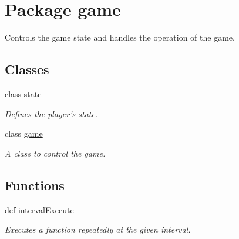 \hypertarget{namespacegame}{
\section{Package game}
\label{namespacegame}
}


Controls the game state and handles the operation of the game.  


\subsection*{Classes}
\begin{DoxyCompactItemize}
\item 
class \hyperlink{classgame_1_1state}{state}
\begin{DoxyCompactList}\small\item\em Defines the player's state. \item\end{DoxyCompactList}\item 
class \hyperlink{classgame_1_1game}{game}
\begin{DoxyCompactList}\small\item\em A class to control the game. \item\end{DoxyCompactList}\end{DoxyCompactItemize}
\subsection*{Functions}
\begin{DoxyCompactItemize}
\item 
def \hyperlink{namespacegame_a40a0c38f5e2e47a449f03097213b1650}{intervalExecute}
\begin{DoxyCompactList}\small\item\em Executes a function repeatedly at the given interval. \item\end{DoxyCompactList}\end{DoxyCompactItemize}
